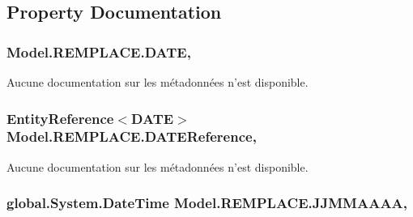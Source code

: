 \subsection{Property Documentation}
\hypertarget{class_model_1_1_r_e_m_p_l_a_c_e_aa79608c4a3babab2a00e7d15e39a0000}{
\subsubsection[{D\-A\-T\-E}]{ Model.\-R\-E\-M\-P\-L\-A\-C\-E.\-D\-A\-T\-E\hspace{0.3cm}{\ttfamily [get]}, {\ttfamily [set]}}}\label{class_model_1_1_r_e_m_p_l_a_c_e_aa79608c4a3babab2a00e7d15e39a0000}


Aucune documentation sur les métadonnées n'est disponible. 

\hypertarget{class_model_1_1_r_e_m_p_l_a_c_e_abf3a8737719c75494fa54c1ffe335d39}{
\subsubsection[{D\-A\-T\-E\-Reference}]{\setlength{\rightskip}{0pt plus 5cm}Entity\-Reference$<${\bf D\-A\-T\-E}$>$ Model.\-R\-E\-M\-P\-L\-A\-C\-E.\-D\-A\-T\-E\-Reference\hspace{0.3cm}{\ttfamily [get]}, {\ttfamily [set]}}}\label{class_model_1_1_r_e_m_p_l_a_c_e_abf3a8737719c75494fa54c1ffe335d39}


Aucune documentation sur les métadonnées n'est disponible. 

\hypertarget{class_model_1_1_r_e_m_p_l_a_c_e_add9e25bf7035011a33a3891f38094899}{
\subsubsection[{J\-J\-M\-M\-A\-A\-A\-A}]{\setlength{\rightskip}{0pt plus 5cm}global.\-System.\-Date\-Time Model.\-R\-E\-M\-P\-L\-A\-C\-E.\-J\-J\-M\-M\-A\-A\-A\-A\hspace{0.3cm}{\ttfamily [get]}, {\ttfamily [set]}}}\label{class_model_1_1_r_e_m_p_l_a_c_e_add9e25bf7035011a33a3891f38094899}


